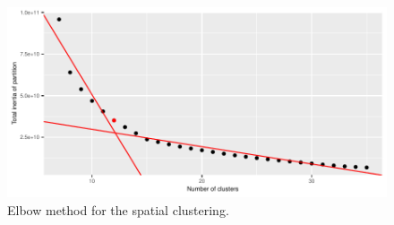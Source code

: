 \begin{appendices}
\begin{figure}[ht]
  \centering
  \includegraphics[]{figs/Chap5/Elb_clust.pdf}
  \caption{Elbow method for the spatial clustering.}
  \label{fig:elb:clust}
\end{figure}
\end{appendices}